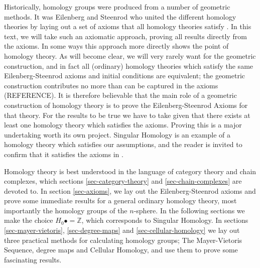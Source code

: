 Historically, homology groups were produced from a number of geometric methods. It was Eilenberg and Steenrod who united the different homology theories by laying out a set of axioms that all homology theories satisfy \cite{Eilenberg}. In this text, we will take such an axiomatic approach, proving all results directly from the axioms. In some ways this approach more directly shows the point of homology theory. As will become clear, we will very rarely want for the geometric construction, and in fact all (ordinary) homology theories which satisfy the same Eilenberg-Steenrod axioms and initial conditions are equivalent; the geometric construction contributes no more than can be captured in the axioms (REFERENCE). It is therefore believable that the main role of a geometric construction of homology theory is to prove the Eilenberg-Steenrod Axioms for that theory. For the results to be true we have to take given that there exists at least one homology theory which satisfies the axioms. Proving this is a major undertaking worth its own project. Singular Homology is an example of a homology theory which satisfies our assumptions, and the reader is invited to confirm that it satisfies the axioms in \cite{Hatcher}.

Homology theory is best understood in the language of category theory and chain complexes, which sections \ref{sec-category-theory} and \ref{sec-chain-complexes} are devoted to. In section \ref{sec-axioms}, we lay out the Eilenberg-Steenrod axioms and prove some immediate results for a general ordinary homology theory, most importantly the homology groups of the $n$-sphere. In the following sections we make the choice $H_0 \bullet=\mathbb{Z}$, which corresponds to Singular Homology. In sections \ref{sec-mayer-vietoris}, \ref{sec-degree-maps} and \ref{sec-cellular-homology} we lay out three practical methods for calculating homology groups; The Mayer-Vietoris Sequence, degree maps and Cellular Homology, and use them to prove some fascinating results.